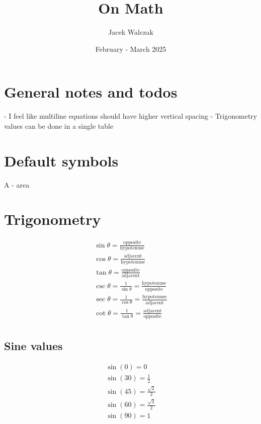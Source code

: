 \documentclass{article}
\title{On Math}
\author{Jacek Walczak}
\date{February - March 2025}
\begin{document}
\maketitle

\section{General notes and todos}
- I feel like multiline equations should have higher vertical spacing
- Trigonometry values can be done in a single table

\section{Default symbols}

A - area

\section{Trigonometry}

\begin{equation}
  \begin{gathered}
    \sin\theta = \frac{\text{opposite}}{\text{hypotenuse}} \\
    \cos\theta = \frac{\text{adjacent}}{\text{hypotenuse}} \\
    \tan\theta = \frac{\text{opposite}}{\text{adjacent}} \\
    \csc\theta = \frac{1}{\sin{\theta}} =
    \frac{\text{hypotenuse}}{\text{opposite}} \\
    \sec\theta = \frac{1}{\cos{\theta}} =
    \frac{\text{hypotenuse}}{\text{adjacent}} \\
    \cot\theta = \frac{1}{\tan{\theta}} =
    \frac{\text{adjacent}}{\text{opposite}} \\
  \end{gathered}
\end{equation}

\subsection{Sine values}
\begin{equation}
  \begin{gathered}
    \sin(0) = 0 \\
    \sin(30) = \frac{1}{2} \\
    \sin(45) = \frac{\sqrt{2}}{2} \\
    \sin(60) = \frac{\sqrt{3}}{2} \\
    \sin(90) = 1
  \end{gathered}
\end{equation}
\end{document}
